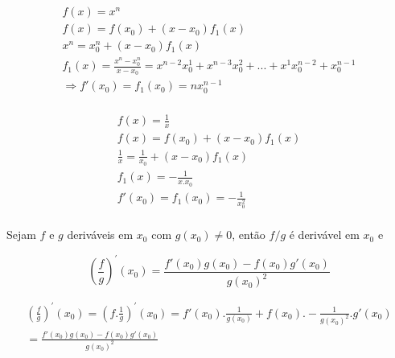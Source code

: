 \documentclass{book}
\begin{document}
\begin{ex}

\[
\begin{array}{l}
f\left( x \right) = x^n \\
f\left( x \right) = f\left( {x_0 } \right) + \left( {x - x_0 } \right)f_1
\left( x \right) \\
x^n = x_0^n + \left( {x - x_0 } \right)f_1 \left( x \right) \\
f_1 \left( x \right) = \frac{x^n - x_0^n }{x - x_0 } = x^{n - 2}x_0^1 +
x^{n - 3}x_0^2 + ... + x^1x_0^{n - 2} + x_0^{n - 1} \\
\Rightarrow f'\left( {x_0 } \right) = f_1 \left( {x_0 } \right) = nx_0^{n -
1} \\
\end{array}
\]

\end{ex}

\begin{ex}

\[
\begin{array}{l}
f\left( x \right) = \frac{1}{x} \\
f\left( x \right) = f\left( {x_0 } \right) + \left( {x - x_0 } \right)f_1
\left( x \right) \\
\frac{1}{x} = \frac{1}{x_0 } + \left( {x - x_0 } \right)f_1 \left( x
\right) \\
f_1 \left( x \right) = - \frac{1}{x.x_0 } \\
f'\left( {x_0 } \right) = f_1 \left( {x_0 } \right) = - \frac{1}{x_0^2 } \\
\end{array}
\]

\end{ex}

\begin{teo}

Sejam $f$ e $g$ deriv\'aveis em $x_0 $ com $g\left( {x_0 } \right) \ne 0$,
ent\~ao $f / g$ \'{e} deriv\'avel em $x_0 $ e

\[
\left( {\frac{f}{g}} \right)^{'}\left( {x_0 } \right) = \frac{f'\left( {x_0 }
\right)g\left( {x_0 } \right) - f\left( {x_0 } \right)g'\left( {x_0 }
\right)}{g\left( {x_0 } \right)^2}
\]

\end{teo}

\begin{dem}

\[
\begin{array}{l}
\left( {\frac{f}{g}} \right)^{'}\left( {x_0 } \right) = \left(
{f.\frac{1}{g}} \right)^{'}\left( {x_0 } \right) = f'\left( {x_0 }
\right).\frac{1}{g\left( {x_0 } \right)} + f\left( {x_0 } \right). -
\frac{1}{g\left( {x_0 } \right)^2}.g'\left( {x_0 } \right) \\
 = \displaystyle\frac{f'\left( {x_0 } \right)g\left( {x_0 } \right) - f\left( {x_0 }
\right)g'\left( {x_0 } \right)}{g\left( {x_0 } \right)^2} \\
\end{array}
\]

\end{dem}
\end{document}
